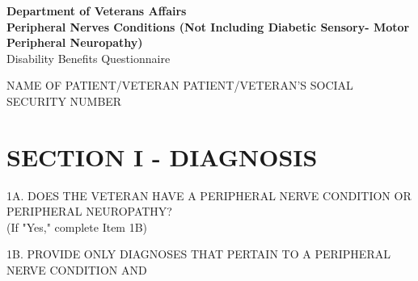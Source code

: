 \documentclass[11pt]{article}
\begin{document}
\begin{center}
\textbf{Department of Veterans Affairs} \\
\textbf{Peripheral Nerves Conditions (Not Including Diabetic Sensory- Motor Peripheral Neuropathy)} \\
Disability Benefits Questionnaire
\end{center}


\noindent
NAME OF PATIENT/VETERAN \hrulefill PATIENT/VETERAN'S SOCIAL SECURITY NUMBER \hrulefill

\section*{SECTION I - DIAGNOSIS}

\noindent
1A. DOES THE VETERAN HAVE A PERIPHERAL NERVE CONDITION OR PERIPHERAL NEUROPATHY? \\
  \hfill (If "Yes," complete Item 1B)

\noindent
1B. PROVIDE ONLY DIAGNOSES THAT PERTAIN TO A PERIPHERAL NERVE CONDITION AND
\end{document}
